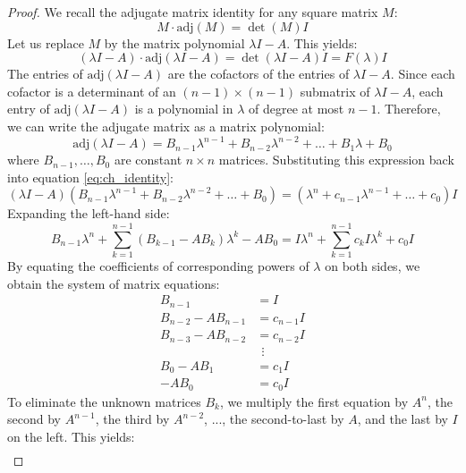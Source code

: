 \documentclass[12pt,a4paper]{report}
\theoremstyle{definition}
\numberwithin{equation}{chapter}
\begin{document}
\begin{proof}
We recall the adjugate matrix identity for any square matrix $M$:
\begin{equation}
M \cdot \text{adj}(M) = \det(M) I
\end{equation}
Let us replace $M$ by the matrix polynomial $\lambda I - A$. This yields:
\begin{equation}\label{eq:ch_identity}
(\lambda I - A) \cdot \text{adj}(\lambda I - A) = \det(\lambda I - A) I = F(\lambda) I
\end{equation}
The entries of $\text{adj}(\lambda I - A)$ are the cofactors of the entries of $\lambda I - A$. Since each cofactor is a determinant of an $(n-1) \times (n-1)$ submatrix of $\lambda I - A$, each entry of $\text{adj}(\lambda I - A)$ is a polynomial in $\lambda$ of degree at most $n-1$. Therefore, we can write the adjugate matrix as a matrix polynomial:
\begin{equation}
\text{adj}(\lambda I - A) = B_{n-1}\lambda^{n-1} + B_{n-2}\lambda^{n-2} + \dots + B_1\lambda + B_0
\end{equation}
where $B_{n-1}, \ldots, B_0$ are constant $n \times n$ matrices. Substituting this expression back into equation \eqref{eq:ch_identity}:
\begin{equation}
(\lambda I - A) \left( B_{n-1}\lambda^{n-1} + B_{n-2}\lambda^{n-2} + \dots + B_0 \right) = \left( \lambda^n + c_{n-1}\lambda^{n-1} + \dots + c_0 \right) I
\end{equation}
Expanding the left-hand side:
\begin{equation}
B_{n-1}\lambda^n + \sum_{k=1}^{n-1} (B_{k-1} - AB_k)\lambda^k - AB_0 = I\lambda^n + \sum_{k=1}^{n-1} c_k I \lambda^k + c_0 I
\end{equation}
By equating the coefficients of corresponding powers of $\lambda$ on both sides, we obtain the system of matrix equations:
\begin{align}
B_{n-1} &= I \\
B_{n-2} - AB_{n-1} &= c_{n-1} I \\
B_{n-3} - AB_{n-2} &= c_{n-2} I \\
&\ \ \vdots \\
B_0 - AB_1 &= c_1 I \\
-AB_0 &= c_0 I
\end{align}
To eliminate the unknown matrices $B_k$, we multiply the first equation by $A^n$, the second by $A^{n-1}$, the third by $A^{n-2}$, ..., the second-to-last by $A$, and the last by $I$ on the left. This yields:
\begin{align}

\end{align}
\end{proof}
\end{document}
